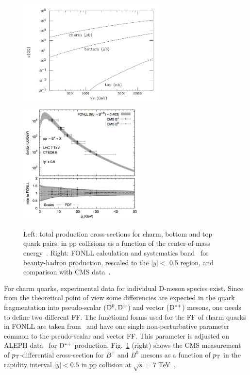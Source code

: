 \begin{figure}[!ht]
  \centering
  \includegraphics[width=7.6cm]{FigCap2/HQxsecPPcoll.png}
      \includegraphics[width=6.4cm]{FigCap2/FONLLBmeson.png}
  \caption{Left: total production cross-sections for charm, bottom and top quark pairs, in pp collisions as a function of the center-of-mass energy~\cite{Mangano:1997ri}. Right: FONLL calculation and systematics band~\cite{Cacciari:2012ny} for beauty-hadron production, rescaled to the $|y| <$ 0.5 region, and comparison with CMS data~\cite{Khachatryan:2011mk,Chatrchyan:2011pw}.}
  \label{fig:HQxsecPPcoll}
\end{figure}
For charm quarks, experimental data for individual D-meson species exist.
Since from the theoretical point of view some differencies are 
expected in the quark fragmentation into 
pseudo-scalar (${\rm D^0}, {\rm D^+}$) and vector (${\rm D^{*+}}$) mesons, 
one needs to define two different FF. The functional forms used for
the FF of charm quarks in FONLL are taken from~\cite{Cacciari:2003zu}
and have one single non-perturbative parameter
common to the pseudo-scalar and vector FF. This parameter is adjusted on
ALEPH data~\cite{Barate:1999bg} for ${\rm D^{*+}}$ production.
Fig.~\ref{fig:HQxsecPPcoll} (right) shows the CMS measurement 
of $p_{\rm T}$-differential cross-section for $B^+$ and $B^0$ mesons
as a function of $p_{\rm T}$ in the rapidity interval $|y| < 0.5$ in pp collision 
at $\sqrt{s} = 7$ TeV~\cite{Khachatryan:2011mk,Chatrchyan:2011pw}, 
